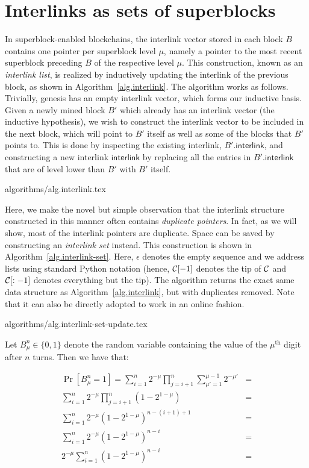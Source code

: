 \section{Interlinks as sets of superblocks}\label{sec.construction}

In superblock-enabled blockchains, the interlink vector stored in each block $B$
contains one pointer per superblock level $\mu$, namely a pointer to the most
recent superblock preceding $B$ of the respective level $\mu$. This
construction, known as an \emph{interlink list}, is realized by inductively
updating the interlink of the previous block, as shown in
Algorithm~\ref{alg.interlink}. The algorithm works as follows. Trivially,
genesis has an empty interlink vector, which forms our inductive basis. Given a
newly mined block $B'$ which already has an interlink vector (the inductive
hypothesis), we wish to construct the interlink vector to be included in the
next block, which will point to $B'$ itself as well as some of the blocks that
$B'$ points to. This is done by inspecting the existing interlink,
$B'.\textsf{interlink}$, and constructing a new interlink $\textsf{interlink}$
by replacing all the entries in $B'.\textsf{interlink}$ that are of level lower
than $B'$ with $B'$ itself.

{algorithms/alg.interlink.tex}

Here, we make the novel but simple observation that the interlink structure
constructed in this manner often contains \emph{duplicate pointers}. In fact, as
we will show, most of the interlink pointers are duplicate. Space can be saved
by constructing an \emph{interlink set} instead. This construction is shown in
Algorithm~\ref{alg.interlink-set}. Here, $\epsilon$ denotes the empty sequence
and we address lists using standard Python notation (hence, $\mathcal{C}[-1]$ denotes
the tip of $\mathcal{C}$ and $\mathcal{C}[:-1]$ denotes everything but the tip). The
algorithm returns the exact same data structure as
Algorithm~\ref{alg.interlink}, but with duplicates removed. Note that it can
also be directly adopted to work in an online fashion.

{algorithms/alg.interlink-set-update.tex}

Let $B^n_\mu \in \{0, 1\}$ denote the random variable containing the value of
the $\mu^{\text{th}}$ digit after $n$ turns. Then we have that:

\begin{align*}
\Pr[B^n_\mu = 1] =
\sum_{i = 1}^n 2^{-\mu} \prod_{j = i + 1}^n \sum_{\mu' = 1}^{\mu - 1} 2^{-\mu'} &=\\
\sum_{i = 1}^n 2^{-\mu} \prod_{j = i + 1}^n (1 - 2^{1 - \mu}) &=\\
\sum_{i = 1}^n 2^{-\mu} (1 - 2^{1 -\mu})^{n - (i + 1) + 1} &=\\
\sum_{i = 1}^n 2^{-\mu} (1 - 2^{1 -\mu})^{n - i} &=\\
2^{-\mu} \sum_{i = 1}^n (1 - 2^{1 -\mu})^{n - i} &=\\
\end{align*}

